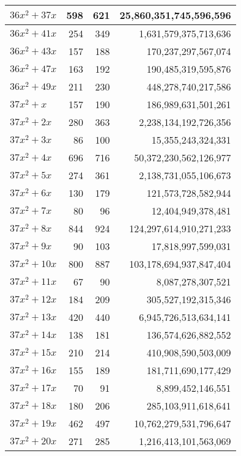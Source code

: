 \documentclass[a4paper]{amsproc}
\theoremstyle{plain}
\begin{document}
\begin{longtable}{ | l | r | r | r | }
$36x^2 + 37x$ & 598 & 621 & 25{,}860{,}351{,}745{,}596{,}596 \\ \hline
$36x^2 + 41x$ & 254 & 349 & 1{,}631{,}579{,}375{,}713{,}636 \\ \hline
$36x^2 + 43x$ & 157 & 188 & 170{,}237{,}297{,}567{,}074 \\ \hline
$36x^2 + 47x$ & 163 & 192 & 190{,}485{,}319{,}595{,}876 \\ \hline
$36x^2 + 49x$ & 211 & 230 & 448{,}278{,}740{,}217{,}586 \\ \hline
$37x^2 + x$ & 157 & 190 & 186{,}989{,}631{,}501{,}261 \\ \hline
$37x^2 + 2x$ & 280 & 363 & 2{,}238{,}134{,}192{,}726{,}356 \\ \hline
$37x^2 + 3x$ & 86 & 100 & 15{,}355{,}243{,}324{,}331 \\ \hline
$37x^2 + 4x$ & 696 & 716 & 50{,}372{,}230{,}562{,}126{,}977 \\ \hline
$37x^2 + 5x$ & 274 & 361 & 2{,}138{,}731{,}055{,}106{,}673 \\ \hline
$37x^2 + 6x$ & 130 & 179 & 121{,}573{,}728{,}582{,}944 \\ \hline
$37x^2 + 7x$ & 80 & 96 & 12{,}404{,}949{,}378{,}481 \\ \hline
$37x^2 + 8x$ & 844 & 924 & 124{,}297{,}614{,}910{,}271{,}233 \\ \hline
$37x^2 + 9x$ & 90 & 103 & 17{,}818{,}997{,}599{,}031 \\ \hline
$37x^2 + 10x$ & 800 & 887 & 103{,}178{,}694{,}937{,}847{,}404 \\ \hline
$37x^2 + 11x$ & 67 & 90 & 8{,}087{,}278{,}307{,}521 \\ \hline
$37x^2 + 12x$ & 184 & 209 & 305{,}527{,}192{,}315{,}346 \\ \hline
$37x^2 + 13x$ & 420 & 440 & 6{,}945{,}726{,}513{,}634{,}141 \\ \hline
$37x^2 + 14x$ & 138 & 181 & 136{,}574{,}626{,}882{,}552 \\ \hline
$37x^2 + 15x$ & 210 & 214 & 410{,}908{,}590{,}503{,}009 \\ \hline
$37x^2 + 16x$ & 155 & 189 & 181{,}711{,}690{,}177{,}429 \\ \hline
$37x^2 + 17x$ & 70 & 91 & 8{,}899{,}452{,}146{,}551 \\ \hline
$37x^2 + 18x$ & 180 & 206 & 285{,}103{,}911{,}618{,}641 \\ \hline
$37x^2 + 19x$ & 462 & 497 & 10{,}762{,}279{,}531{,}796{,}647 \\ \hline
$37x^2 + 20x$ & 271 & 285 & 1{,}216{,}413{,}101{,}563{,}069 \\ \hline

\end{longtable}
\end{document}
